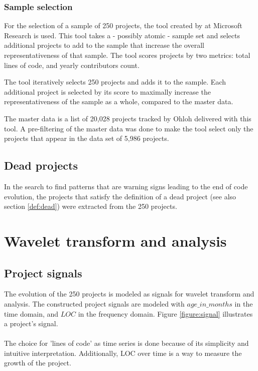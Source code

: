\subsubsection{Sample selection}
For the selection of a sample of 250 projects, the tool created by
\citet{nagappan} at Microsoft Research is used. This tool takes a - possibly
atomic - sample set and selects additional projects to add to the sample that
increase the overall representativeness of that sample. The tool scores
projects by two metrics: total lines of code, and yearly contributors count.

The tool iteratively selects 250 projects and adds it to the sample. Each
additional project is selected by its score to maximally increase the
representativeness of the sample as a whole, compared to the master data.

The master data is a list of 20,028 projects tracked by Ohloh delivered with
this tool. A pre-filtering of the master data was done to make the tool select
only the projects that appear in the data set of 5,986 projects.

\subsection{Dead projects}
In the search to find patterns that are warning signs leading to the end of
code evolution, the projects that satisfy the definition of a dead project (see
also section \ref{def:dead}) were extracted from the 250 projects.

\section{Wavelet transform and analysis}
\subsection{Project signals}
\label{section:signals}
The evolution of the 250 projects is modeled as signals for wavelet transform
and analysis. The constructed project signals are modeled with
$age\_in\_months$ in the time domain, and $LOC$ in the frequency domain. Figure
\ref{figure:signal} illustrates a project's signal.



\paragraph{}
The choice for 'lines of code' as time series is done because of its simplicity
and intuitive interpretation. Additionally, LOC over time is a way to measure
the growth of the project.


